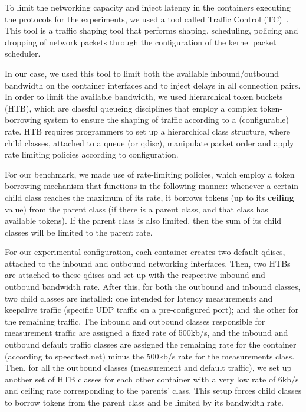 
To limit the networking capacity and inject latency in the containers executing the protocols for the experiments, we used a tool called Traffic Control (TC)~\cite{tc_man_page}. This tool is a traffic shaping tool that performs shaping, scheduling, policing and dropping of network packets through the configuration of the kernel packet scheduler. 


In our case, we used this tool to limit both the available inbound/outbound bandwidth on the container interfaces and to inject delays in all connection pairs. In order to limit the available bandwidth, we used hierarchical token buckets (HTB), which are classful queueing disciplines that employ a complex token-borrowing system to ensure the shaping of traffic according to a (configurable) rate. HTB requires programmers to set up a hierarchical class structure, where child classes, attached to a queue (or qdisc), manipulate packet order and apply rate limiting policies according to configuration.

For our benchmark, we made use of rate-limiting policies, which employ a token borrowing mechanism that functions in the following manner: whenever a certain child class reaches the maximum of its rate, it borrows tokens (up to its \textbf{ceiling} value) from the parent class (if there is a parent class, and that class has available tokens). If the parent class is also limited, then the sum of its child classes will be limited to the parent rate. 

For our experimental configuration, each container creates two default qdiscs, attached to the inbound and outbound networking interfaces. Then, two HTBs are attached to these qdiscs and set up with the respective inbound and outbound bandwidth rate. After this, for both the outbound and inbound classes, two child classes are installed: one intended for latency measurements and keepalive traffic (specific UDP traffic on a pre-configured port); and the other for the remaining traffic. The inbound and outbound classes responsible for measurement traffic are assigned a fixed rate of 500kb/s, and the inbound and outbound default traffic classes are assigned the remaining rate for the container (according to speedtest.net) minus the 500kb/s rate for the measurements class. Then, for all the outbound classes (measurement and default traffic), we set up another set of HTB classes for each other container with a very low rate of 6kb/s and ceiling rate corresponding to the parents' class. This setup forces child classes to borrow tokens from the parent class and be limited by its bandwidth rate.


